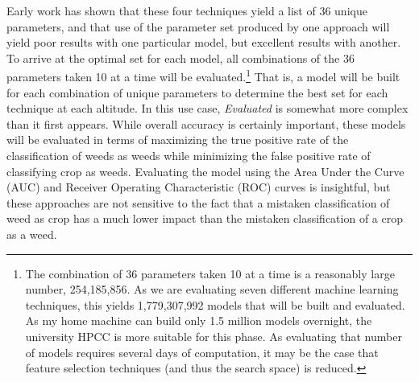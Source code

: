 \documentclass[12pt]{article}
\begin{document}
Early work has shown that these four techniques yield a list of 36 unique parameters, and that use of the parameter set produced by one approach will yield poor results with one particular model, but excellent results with another. To arrive at the optimal set for each model, all combinations of the 36 parameters taken 10 at a time will be evaluated.\footnote{The combination of 36 parameters taken 10 at a time is a reasonably large number, 254,185,856.  As we are evaluating seven different  machine learning techniques, this yields 1,779,307,992 models that will be built and evaluated. As my home machine can build only 1.5 million models overnight, the university HPCC is more suitable for this phase. As evaluating that number of models requires several days of computation, it may be the case that feature selection techniques (and thus the search space) is reduced.} That is, a model will be built for each combination of unique parameters to determine the best set for each technique at each altitude.
In this use case, \textit{Evaluated} is somewhat more complex than it first appears. While overall accuracy is certainly important, these models will be evaluated in terms of maximizing the true positive rate of the classification of weeds as weeds while minimizing the false positive rate of classifying crop as weeds. Evaluating the model using the Area Under the Curve (AUC) and Receiver Operating Characteristic (ROC) curves is insightful, but these approaches are not sensitive to the fact that a mistaken classification of weed as crop has a much lower impact than the mistaken classification of a crop as a weed.\\
\end{document}
